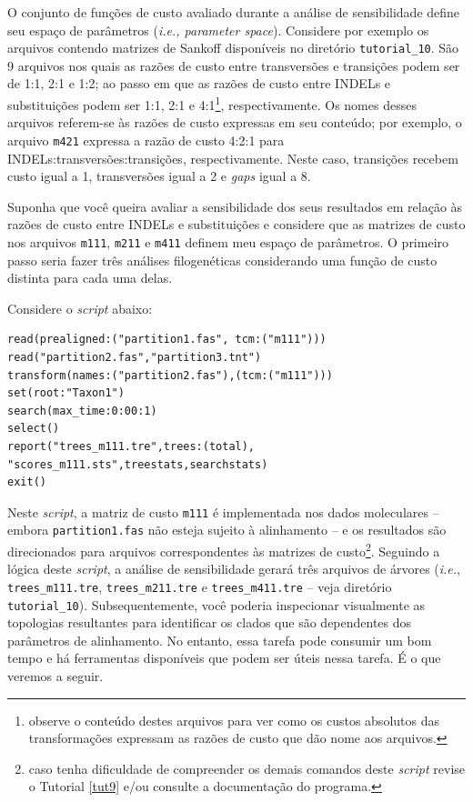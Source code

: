 \begin{refsection}
O conjunto de funções de custo avaliado durante a análise de sensibilidade define seu espaço de parâmetros (\textit{i.e., parameter space}). Considere por exemplo os arquivos contendo matrizes de Sankoff disponíveis no diretório \texttt{tutorial\_10}. São 9 arquivos nos quais as razões de custo entre transversões e transições podem ser de 1:1, 2:1 e 1:2; ao passo em que as razões de custo entre INDELs e substituições podem ser 1:1, 2:1 e 4:1\footnote{ observe o conteúdo destes arquivos para ver como os custos absolutos das transformações expressam as razões de custo que dão nome aos arquivos.}, respectivamente. Os nomes desses arquivos referem-se às razões de custo expressas em seu conteúdo; por exemplo, o arquivo \texttt{m421} expressa a razão de custo 4:2:1 para INDELs:transversões:transições, respectivamente. Neste caso, transições recebem custo igual a 1, transversões igual a 2 e \textit{gaps} igual a 8.

Suponha que você queira avaliar a sensibilidade dos seus resultados em relação às razões de custo entre INDELs e substituições e considere que as matrizes de custo nos arquivos \texttt{m111}, \texttt{m211} e \texttt{m411} definem meu espaço de parâmetros. O primeiro passo seria fazer três análises filogenéticas considerando uma função de custo distinta para cada uma delas. 

	Considere o \textit{script} abaixo:\\

\begin{lstlisting}[caption= Exemplo de \textit{script} para implementar análises de sensibilidade (veja \texttt{tutorial\_10/script2.poy}).,label=tut10:sa:implementation:script1]
read(prealigned:("partition1.fas", tcm:("m111")))
read("partition2.fas","partition3.tnt")
transform(names:("partition2.fas"),(tcm:("m111")))
set(root:"Taxon1")
search(max_time:0:00:1)
select()
report("trees_m111.tre",trees:(total),
"scores_m111.sts",treestats,searchstats)
exit()
\end{lstlisting}

Neste \textit{script}, a matriz de custo \texttt{m111} é implementada nos dados moleculares -- embora \texttt{partition1.fas} não esteja sujeito à alinhamento -- e os resultados são direcionados para arquivos correspondentes às matrizes de custo\footnote{ caso tenha dificuldade de compreender os demais comandos deste \textit{script} revise o Tutorial \ref{tut9} e/ou consulte a documentação do programa.}. Seguindo a lógica deste \textit{script}, a análise de sensibilidade gerará três arquivos de árvores (\textit{i.e.}, \texttt{trees\_m111.tre}, \texttt{trees\_m211.tre} e \texttt{trees\_m411.tre} -- veja diretório \texttt{tutorial\_10}). Subsequentemente, você poderia inspecionar visualmente as topologias resultantes para identificar os clados que são dependentes dos parâmetros de alinhamento. No entanto, essa tarefa pode consumir um bom tempo e há ferramentas disponíveis que podem ser úteis nessa tarefa. É o que veremos a seguir.


\end{refsection}
